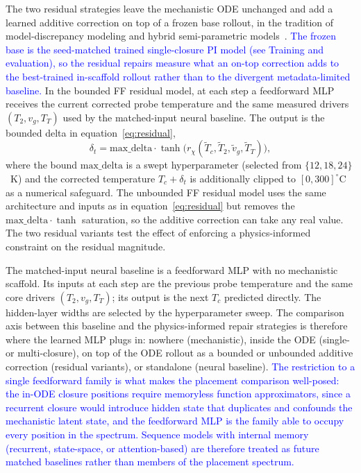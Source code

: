 \documentclass[fleqn,10pt]{wlscirep}
\newcommand{\rev}[1]{\textcolor{blue}{#1}}
\begin{document}
The two residual strategies leave the mechanistic ODE unchanged and add a learned additive correction on top of a frozen base rollout, in the tradition of model-discrepancy modeling and hybrid semi-parametric models~\cite{kennedy2001bayesian,vonStosch2014}. \rev{The frozen base is the seed-matched trained single-closure PI model (see Training and evaluation), so the residual repairs measure what an on-top correction adds to the best-trained in-scaffold rollout rather than to the divergent metadata-limited baseline.} In the bounded FF residual model, at each step a feedforward MLP receives the current corrected probe temperature and the same measured drivers $(T_2, v_g, T_T)$ used by the matched-input neural baseline. The output is the bounded delta in equation~\eqref{eq:residual},
\begin{equation}\label{eq:residual}
\delta_t = \mathrm{max\_delta} \cdot \tanh\!\big(r_{\chi}(\tilde{T}_c, \tilde{T}_2, \tilde{v}_g, \widetilde{T}_T)\big),
\end{equation}
where the bound $\mathrm{max\_delta}$ is a swept hyperparameter (selected from $\{12, 18, 24\}$~K) and the corrected temperature $T_c + \delta_t$ is additionally clipped to $[0, 300]^\circ$C as a numerical safeguard. The unbounded FF residual model uses the same architecture and inputs as in equation~\eqref{eq:residual} but removes the $\mathrm{max\_delta} \cdot \tanh$ saturation, so the additive correction can take any real value. The two residual variants test the effect of enforcing a physics-informed constraint on the residual magnitude.

The matched-input neural baseline is a feedforward MLP with no mechanistic scaffold. Its inputs at each step are the previous probe temperature and the same core drivers $(T_2, v_g, T_T)$; its output is the next $T_c$ predicted directly. The hidden-layer widths are selected by the hyperparameter sweep. The comparison axis between this baseline and the physics-informed repair strategies is therefore where the learned MLP plugs in: nowhere (mechanistic), inside the ODE (single- or multi-closure), on top of the ODE rollout as a bounded or unbounded additive correction (residual variants), or standalone (neural baseline). \rev{The restriction to a single feedforward family is what makes the placement comparison well-posed: the in-ODE closure positions require memoryless function approximators, since a recurrent closure would introduce hidden state that duplicates and confounds the mechanistic latent state, and the feedforward MLP is the family able to occupy every position in the spectrum. Sequence models with internal memory (recurrent, state-space, or attention-based) are therefore treated as future matched baselines rather than members of the placement spectrum.}
\end{document}
